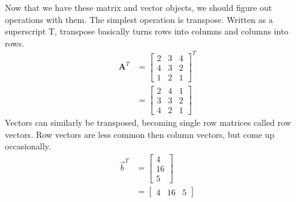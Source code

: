 \documentclass[12pt,]{article}
\newcommand{\mat}[1]{\mathbf{#1}}
\begin{document}

\iffalse

Now that we have these matrix and vector objects, we should figure out operations with them.
The simplest operation is transpose.
Written as a superscript T, transpose basically turns rows into columns and columns into rows.
\begin{align*}
	\mat{A}^T &= 
	\begin{bmatrix}
		2 & 3 & 4 \\ 4 & 3 & 2 \\ 1 & 2 & 1
	\end{bmatrix}^T \\
	&= \begin{bmatrix}
		2 & 4 & 1 \\ 3 & 3 & 2 \\ 4 & 2 & 1
	\end{bmatrix}
\end{align*}
Vectors can similarly be transposed, becoming single row matrices called row vectors.
Row vectors are less common then column vectors, but come up occasionally.
\begin{align*}
	\vec{b}^T &= \begin{bmatrix} 4 \\ 16 \\ 5 \end{bmatrix} \\
	&= \begin{bmatrix} 4 & 16 & 5 \end{bmatrix}
\end{align*}
\end{document}
